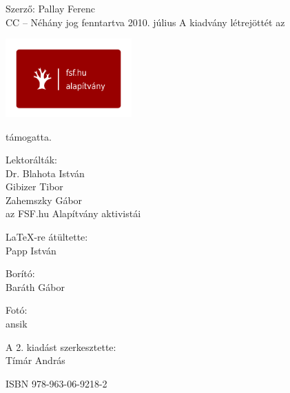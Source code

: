 \documentclass[a4paper,11pt,oneside]{book}
\begin{document}
\begin{center}
Szerző: Pallay Ferenc\\
CC -- Néhány jog fenntartva
\vfill
2010. július
\vfill
\vfill
\vfill
A kiadvány létrejöttét az 

\includegraphics[width=4.851cm]{oocalcv2-img1.png}

támogatta.
\vfill
\vfill
\vfill

Lektorálták: \\
Dr. Blahota István\\
Gibizer Tibor\\
Zahemszky Gábor\\
az FSF.hu Alapítvány aktivistái

\vfill
\vfill
\LaTeX-re átültette:\\
Papp István

Borító:\\
Baráth Gábor

Fotó:\\
ansik

A 2. kiadást szerkesztette:\\
Tímár András

\vfill
ISBN 978-963-06-9218-2



\end{center}

\vfill
\vfill
{}

\clearpage
{}


\tableofcontents























\listoffigures
\listoftables
\end{document}
